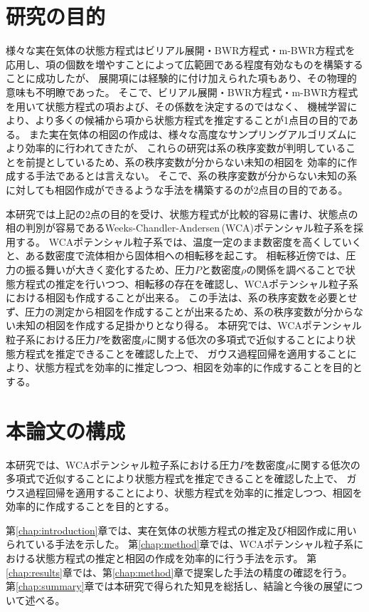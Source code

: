 \documentclass[titlepage]{jsreport}
\begin{document}
\section{研究の目的} \label{intro-purpose}
様々な実在気体の状態方程式はビリアル展開・BWR方程式・m-BWR方程式を応用し、項の個数を増やすことによって広範囲である程度有効なものを構築することに成功したが、
展開項には経験的に付け加えられた項もあり、その物理的意味も不明瞭であった。
そこで、ビリアル展開・BWR方程式・m-BWR方程式を用いて状態方程式の項および、その係数を決定するのではなく、
機械学習により、より多くの候補から項から状態方程式を推定することが1点目の目的である。
また実在気体の相図の作成は、様々な高度なサンプリングアルゴリズムにより効率的に行われてきたが、
これらの研究は系の秩序変数が判明していることを前提としているため、系の秩序変数が分からない未知の相図を
効率的に作成する手法であるとは言えない。
そこで、系の秩序変数が分からない未知の系に対しても相図作成ができるような手法を構築するのが2点目の目的である。

本研究では上記の2点の目的を受け、状態方程式が比較的容易に書け、状態点の相の判別が容易であるWeeks-Chandler-Andersen\,(WCA)ポテンシャル粒子系を採用する。
WCAポテンシャル粒子系では、温度一定のまま数密度を高くしていくと、ある数密度で流体相から固体相への相転移を起こす。
相転移近傍では、圧力の振る舞いが大きく変化するため、圧力$P$と数密度$\rho$の関係を調べることで状態方程式の推定を行いつつ、相転移の存在を確認し、WCAポテンシャル粒子系における相図も作成することが出来る。
この手法は、系の秩序変数を必要とせず、圧力の測定から相図を作成することが出来るため、系の秩序変数が分からない未知の相図を作成する足掛かりとなり得る。
本研究では、WCAポテンシャル粒子系における圧力$P$を数密度$\rho$に関する低次の多項式で近似することにより状態方程式を推定できることを確認した上で、
ガウス過程回帰を適用することにより、状態方程式を効率的に推定しつつ、相図を効率的に作成することを目的とする。



\section{本論文の構成} \label{intro-constitution}
本研究では、WCAポテンシャル粒子系における圧力$P$を数密度$\rho$に関する低次の多項式で近似することにより状態方程式を推定できることを確認した上で、
ガウス過程回帰を適用することにより、状態方程式を効率的に推定しつつ、相図を効率的に作成することを目的とする。

第\ref{chap:introduction}章では、実在気体の状態方程式の推定及び相図作成に用いられている手法を示した。
第\ref{chap:method}章では、WCAポテンシャル粒子系における状態方程式の推定と相図の作成を効率的に行う手法を示す。
第\ref{chap:results}章では、第\ref{chap:method}章で提案した手法の精度の確認を行う。
第\ref{chap:summary}章では本研究で得られた知見を総括し、結論と今後の展望について述べる。
\end{document}
